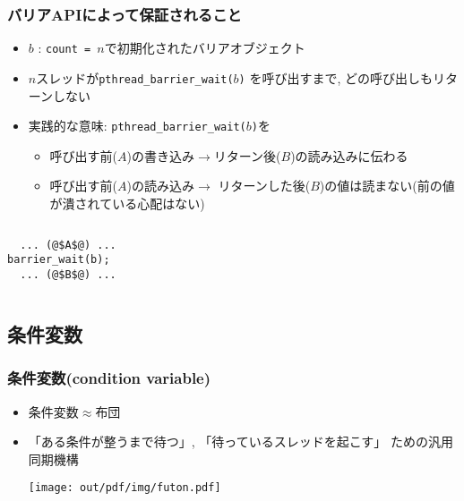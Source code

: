 \documentclass[12pt,dvipdfmx]{beamer}
\begin{document}
\begin{frame}[fragile]
  \frametitle{バリアAPIによって保証されること}
  \begin{itemize}
  \item [] $b$ : {\tt count = }$n$で初期化されたバリアオブジェクト
  \item $n$スレッドが{\tt pthread\_barrier\_wait($b$)}
    を呼び出すまで, どの呼び出しもリターンしない
  \item 実践的な意味: {\tt pthread\_barrier\_wait($b$)}を
    \begin{itemize}
    \item 呼び出す前($A$)の書き込み$\rightarrow$リターン後($B$)の読み込みに伝わる
    \item 呼び出す前($A$)の読み込み$\rightarrow$
      リターンした後($B$)の値は読まない(前の値が潰されている心配はない)
    \end{itemize}
  \end{itemize}

  \begin{columns}
    \begin{column}{0.4\textwidth}
      \begin{lstlisting}
  ... (@$A$@) ...
barrier_wait(b);        
  ... (@$B$@) ...
      \end{lstlisting}
    \end{column}
    \begin{column}{0.5\textwidth}
      \begin{center}
      \end{center}
    \end{column}
  \end{columns}
\end{frame}

\subsection{条件変数}
\begin{frame}
  \frametitle{条件変数(condition variable)}
  \begin{itemize}
  \item 条件変数$\approx$布団
  \item 「ある条件が整うまで待つ」, 「待っているスレッドを起こす」
    ための汎用同期機構

    \begin{center}
\texttt{[image: out/pdf/img/futon.pdf]}
\end{center}
    
  \end{itemize}
\end{frame}
\end{document}
